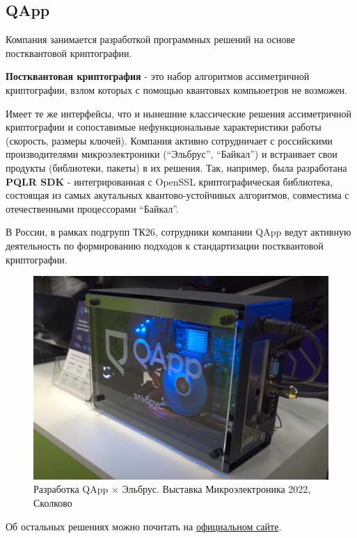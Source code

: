 \subsection{QApp}

Компания занимается разработкой программных решений на основе постквантовой криптографии. 

\textbf{Постквантовая криптография} - это набор алгоритмов ассиметричной криптографии, взлом которых с помощью квантовых компьюетров не возможен. 

Имеет те же интерфейсы, что и нынешние классические решения ассиметричной криптографии и сопоставимые нефункциональные характеристики работы (скорость, размеры ключей).
Компания активно сотрудничает с российскими производителями микроэлектроники (``Эльбрус'', ``Байкал'') и встраивает свои продукты (библиотеки, пакеты) в их решения. Так, например, была разработана \textbf{PQLR SDK} - интегрированная с OpenSSL криптографическая библиотека, состоящая из самых акутальных квантово-устойчивых алгоритмов, совместима с отечественными процессорами ``Байкал''.

В России, в рамках подгрупп ТК26, сотрудники компании QApp ведут активную деятельность по формированию подходов к стандартизации постквантовой криптографии.

\begin{figure}[h!]
    \centering
    \includegraphics[width=1.0\linewidth]{pics/qapp_x_elbrus.png}
    \caption{Разработка QApp $\times$ Эльбрус. Выставка Микроэлектроника 2022, Сколково}
    \label{qapp}
\end{figure}

Об остальных решениях можно почитать на \href{https://qapp.tech/}{официальном сайте}. 

